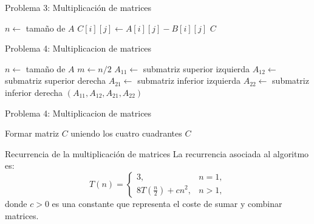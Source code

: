 \documentclass{beamer}
\begin{document}
\begin{frame}{Problema 3: Multiplicación de matrices}
\begin{algorithm}[H]
\caption{Multiplicación de matrices por divide y vencerás(Parte II)}
\begin{algorithmic}[1]
  \State $n \gets$ tamaño de $A$
      \State $C[i][j] \gets A[i][j] - B[i][j]$
    \EndFor
  \EndFor
  \State \Return $C$
\EndFunction
\end{algorithmic}
\end{algorithm}
\end{frame}

\begin{frame}{Problema 4: Multiplicacion de matrices}
\begin{algorithm}[H]
\caption{Dividir y combinar matrices}
\begin{algorithmic}[1]
  \State $n \gets$ tamaño de $A$
  \State $m \gets n/2$
  \State $A_{11} \gets$ submatriz superior izquierda
  \State $A_{12} \gets$ submatriz superior derecha
  \State $A_{21} \gets$ submatriz inferior izquierda
  \State $A_{22} \gets$ submatriz inferior derecha
  \State \Return $(A_{11}, A_{12}, A_{21}, A_{22})$
\EndFunction
\end{algorithmic}
\end{algorithm}
\end{frame}




\begin{frame}{Problema 4: Multiplicacion de matrices}
\begin{algorithm}[H]
\caption{Dividir y combinar matrices}
\begin{algorithmic}[1]

  \State Formar matriz $C$ uniendo los cuatro cuadrantes
  \State \Return $C$
\EndFunction
\end{algorithmic}
\end{algorithm}
\end{frame}


\begin{frame}{Recurrencia de la multiplicación de matrices}
La recurrencia asociada al algoritmo es:
\[
T(n) =
\begin{cases}
3, & n = 1, \\[6pt]
8T\!\left(\tfrac{n}{2}\right) + c n^2, & n > 1,
\end{cases}
\]
donde $c>0$ es una constante que representa el coste de sumar y combinar matrices.
\end{frame}
\end{document}
